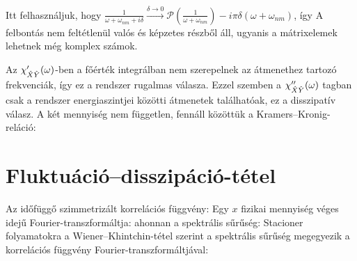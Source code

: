   Itt felhasználjuk, hogy $\frac{1}{\omega+\omega_{nm}+i\delta}\xrightarrow{\delta\to 0}\mathcal{P}\left(\frac{1}{\omega+\omega_{nm}}\right)-i\pi\delta (\omega+\omega_{nm})$, így
  A felbontás nem feltétlenül valós és képzetes részből áll, ugyanis a mátrixelemek lehetnek még komplex számok. 
  
  Az $\chi_{\hat{X}\hat{Y}}'(\omega)$-ben a főérték integrálban nem szerepelnek az átmenethez tartozó frekvenciák, így ez a rendszer rugalmas válasza. Ezzel szemben a $\chi_{\hat{X}\hat{Y}}''(\omega)$ tagban csak a rendszer energiaszintjei közötti átmenetek találhatóak, ez a disszipatív válasz. A két mennyiség nem független, fennáll közöttük a Kramers--Kronig-reláció:
  
 \section{Fluktuáció--disszipáció-tétel}\label{ss:B11-fdt}
  
  Az időfüggő szimmetrizált korrelációs függvény:
  Egy $x$ fizikai mennyiség véges idejű Fourier-transzformáltja:
  ahonnan a spektrális sűrűség:
  Stacioner folyamatokra a Wiener--Khintchin-tétel szerint a spektrális sűrűség megegyezik a korrelációs függvény Fourier-transzformáltjával:
  
